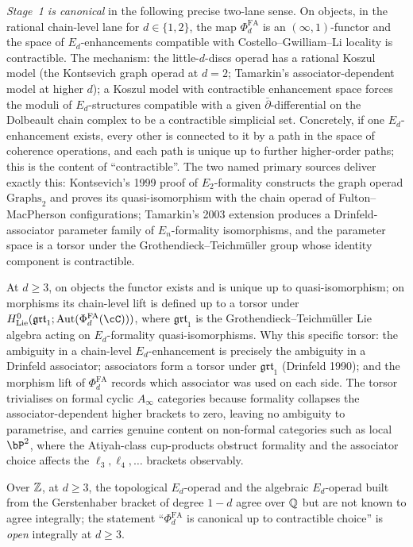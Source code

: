 \begin{theorem}
\emph{Stage~1 is canonical} in the following precise two-lane sense.
On objects, in the rational chain-level lane for $d \in \{1,2\}$, the
map $\Phi^{\mathrm{FA}}_d$ is an $(\infty,1)$-functor and the space of
$E_d$-enhancements compatible with Costello--Gwilliam--Li locality is
contractible. The mechanism: the little-$d$-discs operad has a rational
Koszul model (the Kontsevich graph operad at $d=2$; Tamarkin's
associator-dependent model at higher $d$); a Koszul model with
contractible enhancement space forces the moduli of $E_d$-structures
compatible with a given $\bar\partial$-differential on the Dolbeault
chain complex to be a contractible simplicial set. Concretely, if one
$E_d$-enhancement exists, every other is connected to it by a path in
the space of coherence operations, and each path is unique up to
further higher-order paths; this is the content of ``contractible''.
The two named primary sources deliver exactly this: Kontsevich's 1999
proof of $E_2$-formality constructs the graph operad $\mathrm{Graphs}_2$
and proves its quasi-isomorphism with the chain operad of Fulton--MacPherson
configurations; Tamarkin's 2003 extension produces a Drinfeld-associator
parameter family of $E_n$-formality isomorphisms, and the parameter
space is a torsor under the Grothendieck--Teichm\"uller group whose
identity component is contractible.

At $d \geq 3$, on objects the functor exists and is unique up to
quasi-isomorphism; on morphisms its chain-level lift is defined up to
a torsor under
$H^{0}_{\mathrm{Lie}}(\mathfrak{grt}_1;
\mathrm{Aut}(\Phi^{\mathrm{FA}}_d(\cC)))$, where $\mathfrak{grt}_1$ is
the Grothendieck--Teichm\"uller Lie algebra acting on $E_d$-formality
quasi-isomorphisms. Why this specific torsor: the ambiguity in a
chain-level $E_d$-enhancement is precisely the ambiguity in a Drinfeld
associator; associators form a torsor under $\mathfrak{grt}_1$ (Drinfeld
1990); and the morphism lift of $\Phi^{\mathrm{FA}}_d$ records which
associator was used on each side. The torsor trivialises on formal
cyclic $A_\infty$ categories because formality collapses the
associator-dependent higher brackets to zero, leaving no ambiguity to
parametrise, and carries genuine content on non-formal categories
such as local~$\bP^2$, where the Atiyah-class cup-products obstruct
formality and the associator choice affects the $\ell_3, \ell_4, \dots$
brackets observably.

Over $\mathbb{Z}$, at $d \geq 3$, the topological $E_d$-operad and the
algebraic $E_d$-operad built from the Gerstenhaber bracket of degree
$1-d$ agree over $\mathbb{Q}$ but are not known to agree integrally; the
statement ``$\Phi^{\mathrm{FA}}_d$ is canonical up to contractible
choice'' is \emph{open} integrally at $d \geq 3$.
\end{theorem}

